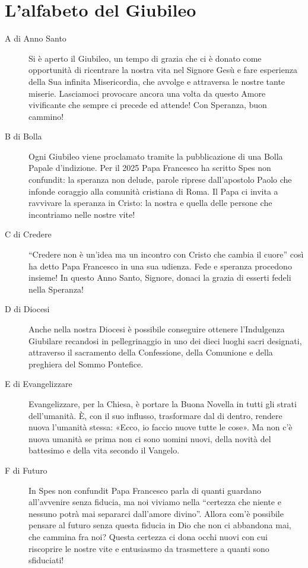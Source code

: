 \section{L'alfabeto del Giubileo}

\begin{description}
  \item[A di Anno Santo] Si è aperto il Giubileo, un tempo di grazia che ci è donato come opportunità di ricentrare la nostra vita nel Signore Gesù e fare esperienza della Sua infinita Misericordia, che avvolge e attraversa le nostre tante miserie. Lasciamoci provocare ancora una volta da questo Amore vivificante che sempre ci precede ed attende! Con Speranza, buon cammino!

  \item[B di Bolla] Ogni Giubileo viene proclamato tramite la pubblicazione di una Bolla Papale d’indizione. Per il 2025 Papa Francesco ha scritto Spes non confundit: la speranza non delude, parole riprese dall’apostolo Paolo che infonde coraggio alla comunità cristiana di Roma. Il Papa ci invita a ravvivare la speranza in Cristo: la nostra e quella delle persone che incontriamo nelle nostre vite!

  \item[C di Credere] “Credere non è un’idea ma un incontro con Cristo che cambia il cuore” così ha detto Papa Francesco in una sua udienza. Fede e speranza procedono insieme! In questo Anno Santo, Signore, donaci la grazia di esserti fedeli nella Speranza!

  \item[D di Diocesi] Anche nella nostra Diocesi è possibile conseguire ottenere l'Indulgenza Giubilare recandosi in pellegrinaggio in uno dei dieci luoghi sacri designati, attraverso il sacramento della Confessione, della Comunione e della preghiera del Sommo Pontefice.

  \item[E di Evangelizzare] Evangelizzare, per la Chiesa, è portare la Buona Novella in tutti gli strati dell’umanità. È, con il suo influsso, trasformare dal di dentro, rendere nuova l’umanità stessa: «Ecco, io faccio nuove tutte le cose». Ma non c’è nuova umanità se prima non ci sono uomini nuovi, della novità del battesimo e della vita secondo il Vangelo.

  \item[F di Futuro] In Spes non confundit Papa Francesco parla di quanti guardano all’avvenire senza fiducia, ma noi viviamo nella “certezza che niente e nessuno potrà mai separarci dall’amore divino”. Allora com’è possibile pensare al futuro senza questa fiducia in Dio che non ci abbandona mai, che cammina fra noi? Questa certezza ci dona occhi nuovi con cui riscoprire le nostre vite e entusiasmo da trasmettere a quanti sono sfiduciati!


\end{description}
